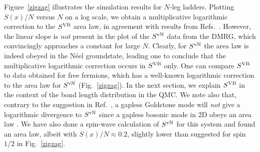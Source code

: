\documentclass[prl,aps,twocolumn,floatfix,amsmath,amssymb,superscriptaddress,tightenlines]{revtex4}
\begin{document}
Figure~\ref{zigzag} illustrates the simulation results for $N$-leg ladders.
Plotting $S(x)/N$ versus $N$ on a log scale, we obtain a
multiplicative logarithmic correction to the $S^{\rm VB}$ area law, in agreement
with results from Refs.~\cite{Alet,Chh}.  However, the linear slope is {\it not} present in
the plot of the $S^{ \rm vN}$ data from the DMRG, which convincingly approaches a
constant for large $N$.  Clearly, for $S^{ \rm vN}$ the area law is
indeed obeyed in the N\'eel groundstate, leading one to conclude that the
multiplicative logarithmic correction occurs in $S^{\rm VB}$ only.  One can
compare $S^{\rm VB}$ to data obtained for free fermions, which has a well-known \cite{2dfermion} logarithmic correction to the area law for $S^{ \rm vN}$ (Fig.~\ref{zigzag}).
In the next section, we explain $S^{\rm VB}$
in the context of the bond length distribution in the QMC.
We note also that, contrary to the suggestion in Ref.~\cite{Alet}, a gapless Goldstone mode will {\it not} give a logarithmic
divergence to $S^{ \rm vN}$ since a gapless bosonic mode in 2D
obeys an area law \cite{2dboson}.  We have also done a spin-wave calculation of
$S^{\rm vN}$ for this system and found an area law, albeit with
$S(x)/N\approx 0.2$, slightly lower than suggested for spin~$1/2$ in Fig.~\ref{zigzag}.

\end{document}
